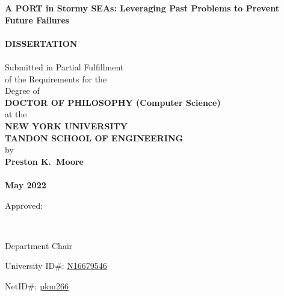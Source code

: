 \thispagestyle{empty}
\begin{center}
{\large
{\bf A PORT in Stormy SEAs: Leveraging Past Problems to Prevent Future Failures}\\
\mbox{} \\
{\huge \bf DISSERTATION}\\
\mbox{} \\
Submitted in Partial Fulfillment\\
of the Requirements for the\\
Degree of\\
{\bf DOCTOR OF PHILOSOPHY (Computer Science)}\\
at the\\
{\bf NEW YORK UNIVERSITY\\TANDON SCHOOL OF ENGINEERING}\\
by\\
{\bf Preston K.\ Moore}\\
\mbox{} \\
{\bf  May 2022}}
\end{center}
\vspace{.35 in}
\hspace{4 in} Approved:

\vspace{.2 in}

\hspace{3.35 in} \hrulefill\

\vspace{-.2 in}

\hspace{3.6 in} Department Chair

\vspace{.2 in}

\hspace{-.5 in}University ID\#: \underline{N16679546} \hspace{2 in} \hrulefill \

\hspace{-.5 in}NetID\#: \underline{pkm266} \hspace{4 in}

\vspace{-.4 in}

\hspace{3.35 in}  %


